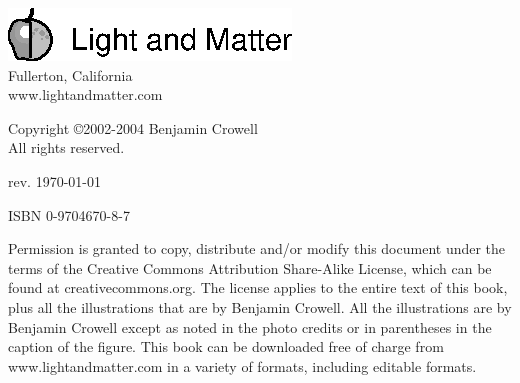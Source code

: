 \thispagestyle{empty}

\vspace{100mm}

\noindent
\includegraphics{ch00/figs/lmlogo}\\
Fullerton, California\\
www.lightandmatter.com

\vspace{20mm}
\noindent
Copyright \copyright  2002-2004 Benjamin Crowell\\
All rights reserved.

\vspace{20mm}
\noindent
rev. \today{}

\vspace{6mm}
\noindent
ISBN 0-9704670-8-7

\vspace{6mm}
\noindent
Permission is granted to copy, distribute and/or modify this
document under the terms of the Creative Commons Attribution
Share-Alike License, which can be found at creativecommons.org. The license
applies to the entire text of this book, plus all the illustrations
that are by Benjamin Crowell. All the illustrations are by Benjamin
Crowell except as noted in the photo credits or in parentheses
in the caption of the figure.
This book can be downloaded free of charge
from www.lightandmatter.com in a variety of formats,
including editable formats.
